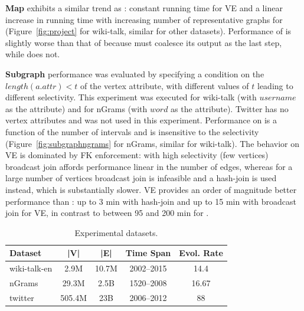 {\bf Map} exhibits a similar trend
as : constant running time for VE and a linear increase
in running time with increasing number of representative graphs for
\sg (Figure~\ref{fig:project} for wiki-talk, similar for other
datasets).  Performance of  is slightly worse than that of
 because  must coalesce its output as the last
step, while  does not. 

{\bf Subgraph} performance was evaluated by specifying a condition on
the $length(a.attr)<t$ of the vertex attribute, with different values
of $t$ leading to different selectivity.  This experiment was executed
for wiki-talk (with $username$ as the attribute) and for nGrams (with
$word$ as the attribute).  Twitter has no vertex attributes and was
not used in this experiment.  Performance on \sg is a function of the
number of intervals and is insensitive to the selectivity
(Figure~\ref{fig:subgraphngrams} for nGrams, similar for wiki-talk).
The behavior on VE is dominated by FK enforcement: with high
selectivity (few vertices) broadcast join affords performance linear
in the number of edges, whereas for a large number of vertices
broadcast join is infeasible and a hash-join is used instead, which is
substantially slower.  VE provides an order of magnitude better
performance than \sg: up to 3 min with hash-join and up to 15 min with
broadcast join for VE, in contrast to between 95 and 200 min for \sg.

\begin{table}
\caption{Experimental datasets.}
\vspace{-0.1in}
\small
\begin{tabular}{l | c | c | c | c }
\hline
\multicolumn{1}{l|}{\bfseries Dataset} & \multicolumn{1}{c|}{\bfseries |V|} & \multicolumn{1}{c|}{\bfseries |E|} & \multicolumn{1}{c|}{\bfseries Time Span} & \multicolumn{1}{c}{\bfseries Evol. Rate} \\ \hline
wiki-talk-en & 2.9M & 10.7M & 2002--2015 & 14.4 \\ \hline
nGrams & 29.3M & 2.5B & 1520--2008 & 16.67 \\ \hline
twitter & 505.4M & 23B & 2006--2012 & 88 \\ \hline
\end{tabular}
\vspace{-0.1cm}
\label{tab:datasets}
\end{table}

